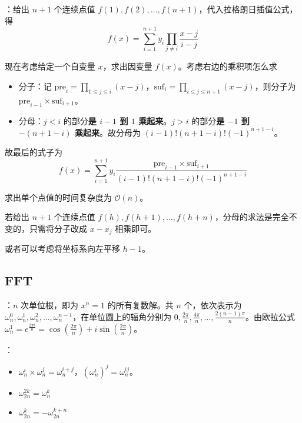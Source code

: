 
：给出 $n + 1$ 个连续点值 $f(1), f(2), \dots, f(n + 1)$，代入拉格朗日插值公式，得
\[
f(x) = \sum\limits_{i = 1}^{n + 1}y_i \prod\limits_{j \neq i}\frac{x - j}{i - j}
\]

现在考虑给定一个自变量 $x$，求出因变量 $f(x)$。考虑右边的乘积项怎么求

\begin{itemize}
    \item 分子：记 $\mathrm{pre}_i = \prod_{1 \leq j \leq i} (x - j)$，$\mathrm{suf}_i = \prod_{i \leq j \leq n + 1} (x - j)$，则分子为 $\mathrm{pre}_{i - 1} \times \mathrm{suf}_{i + 1}$。
    \item 分母：$j < i$ 的部分\textbf{是 $i - 1$ 到 $1$ 乘起来}。$j > i$ 的部分\textbf{是 $-1$ 到 $-(n + 1 - i)$ 乘起来}。故分母为 $(i - 1)! (n + 1 - i)! (-1)^{n + 1 - i}$。
\end{itemize}

故最后的式子为
\[
f(x) = \sum\limits_{i = 1}^{n + 1}y_i \frac{\mathrm{pre}_{i - 1} \times \mathrm{suf}_{i + 1}}{(i - 1)!(n + 1 - i)!(-1)^{n + 1 - i}}
\]

求出单个点值的时间复杂度为 $\mathcal{O}(n)$。

\begin{quoteblock}
若给出 $n + 1$ 个连续点值 $f(h), f(h + 1), \dots, f(h + n)$，分母的求法是完全不变的，只需将分子改成 $x - x_j$ 相乘即可。

或者可以考虑将坐标系向左平移 $h - 1$。
\end{quoteblock}


\subsection{FFT}

：$n$ 次单位根，即为 $x^n = 1$ 的所有复数解。共 $n$ 个，依次表示为 $\omega_n^0, \omega_n^1, \omega_n^2, \dots, \omega_n^{n - 1}$，在单位圆上的辐角分别为 $0, \frac{2\pi}{n}, \frac{4\pi}{n}, \dots, \frac{2(n - 1)\pi}{n}$。由欧拉公式 $\omega_n^1 = e^{\frac{2\pi i}{n}} = \cos(\frac{2\pi}{n}) + i \sin(\frac{2\pi}{n})$。

：
\begin{itemize}
    \item $\omega_n^i \times \omega_n^j = \omega_n^{i + j}$，$\left(\omega_n^i\right)^j = \omega_n^{ij}$。
    \item $\omega_{2n}^{2k} = \omega_n^k$
    \item $\omega_{2n}^k = -\omega_{2n}^{k + n}$
\end{itemize}

